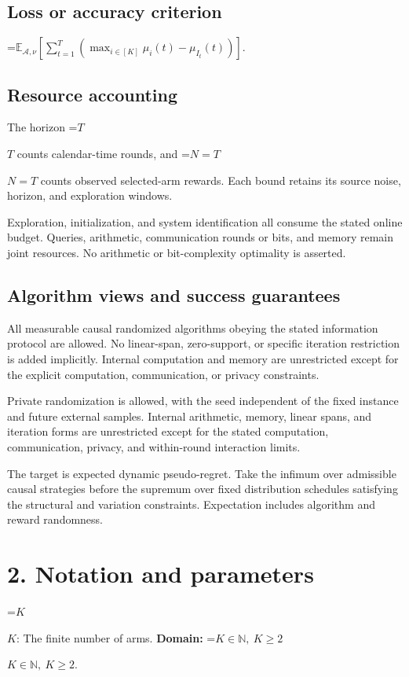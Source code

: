 \documentclass[10pt,a4paper]{article}
\newcommand{\AtlasMath}[1]{\par\begingroup\centering\setbox0=\hbox{$\displaystyle #1$}\ifdim\wd0>1.4\linewidth\typeout{ATLAS WIDE FORMULA: \the\wd0}\fi\ifdim\wd0>\linewidth\resizebox{\linewidth}{!}{\box0}\else\box0\fi\par\endgroup}
\newcommand{\AtlasInlineMath}[1]{\begingroup\setbox0=\hbox{$#1$}\ifdim\wd0>.4\linewidth\endgroup\AtlasMath{#1}\else\endgroup$#1$\fi}
\begin{document}
\subsection{Loss or accuracy criterion}

\AtlasMath{\mathbb{E}_{\mathcal{A},\nu}\!\left[\sum_{t=1}^{T}\left(\max_{i\in[K]}\mu_i(t)-\mu_{I_t}(t)\right)\right].}


\subsection{Resource accounting}
The horizon \AtlasInlineMath{T} counts calendar-time rounds, and \AtlasInlineMath{N=T} counts observed selected-arm rewards. Each bound retains its source noise, horizon, and exploration windows.

Exploration, initialization, and system identification all consume the stated online budget. Queries, arithmetic, communication rounds or bits, and memory remain joint resources. No arithmetic or bit-complexity optimality is asserted.

\subsection{Algorithm views and success guarantees}
All measurable causal randomized algorithms obeying the stated information protocol are allowed. No linear-span, zero-support, or specific iteration restriction is added implicitly. Internal computation and memory are unrestricted except for the explicit computation, communication, or privacy constraints.

Private randomization is allowed, with the seed independent of the fixed instance and future external samples. Internal arithmetic, memory, linear spans, and iteration forms are unrestricted except for the stated computation, communication, privacy, and within-round interaction limits.

The target is expected dynamic pseudo-regret. Take the infimum over admissible causal strategies before the supremum over fixed distribution schedules satisfying the structural and variation constraints. Expectation includes algorithm and reward randomness.

\section{2. Notation and parameters}
\AtlasInlineMath{K}: The finite number of arms. \textbf{Domain:} \AtlasInlineMath{K\in\mathbb N,\ K\ge2}.
\end{document}
